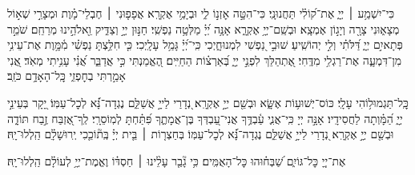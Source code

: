 \documentclass[twoside, openany, parskip=half, 11pt]{book}
\begin{document}
{
\begin{narrow} 
כִּי־יִשְׁמַ֥ע ׀ יְיָ֑ אֶת־ק֝וֹלִ֗י תַּחֲנוּנָֽי׃
כִּי־הִטָּ֣ה אׇזְנ֣וֹ לִ֑י וּבְיָמַ֥י אֶקְרָֽא׃
אֲפָפ֤וּנִי ׀ חֶבְלֵי־מָ֗וֶת וּמְצָרֵ֣י שְׁא֣וֹל מְצָא֑וּנִי צָרָ֖ה וְיָג֣וֹן אֶמְצָֽא׃
וּבְשֵֽׁם־יְיָ֥ אֶקְרָ֑א אָנָּ֥ה יְ֝יָ֗ מַלְּטָ֥ה נַפְשִֽׁי׃
חַנּ֣וּן יְיָ֣ וְצַדִּ֑יק וֵ֖אלֹהֵ֣ינוּ מְרַחֵֽם׃
שֹׁמֵ֣ר פְּתָאיִ֣ם יְיָ֑ דַּ֝לֹּתִ֗י וְלִ֣י יְהוֹשִֽׁיעַ׃
שׁוּבִ֣י נַ֭פְשִׁי לִמְנוּחָ֑יְכִי כִּֽי־יְ֝יָ֗ גָּמַ֥ל עָלָֽיְכִי׃
כִּ֤י חִלַּ֥צְתָּ נַפְשִׁ֗י מִ֫מָּ֥וֶת אֶת־עֵינִ֥י מִן־דִּמְעָ֑ה אֶת־רַגְלִ֥י מִדֶּֽחִי׃
אֶ֭תְהַלֵּךְ לִפְנֵ֣י יְיָ֑ בְּ֝אַרְצ֗וֹת הַחַיִּֽים׃
הֶ֭אֱמַנְתִּי כִּ֣י אֲדַבֵּ֑ר אֲ֝נִ֗י עָנִ֥יתִי מְאֹֽד׃
אֲ֭נִי אָמַ֣רְתִּי בְחׇפְזִ֑י כׇּֽל־הָאָדָ֥ם כֹּזֵֽב׃
\end{narrow}

כׇּֽל־תַּגְמוּל֥וֹהִי עָלָֽי׃
כּוֹס־יְשׁוּע֥וֹת אֶשָּׂ֑א וּבְשֵׁ֖ם יְיָ֣ אֶקְרָֽא׃
נְ֭דָרַי לַייָ֣ אֲשַׁלֵּ֑ם נֶגְדָה־נָּ֗֝א לְכׇל־עַמּֽוֹ׃
יָ֭קָר בְּעֵינֵ֣י יְיָ֑ הַ֝מָּ֗וְתָה לַחֲסִידָֽיו׃
אָנָּ֣ה יְיָ כִּֽי־אֲנִ֢י עַ֫בְדֶּ֥ךָ אֲנִי־עַ֭בְדְּךָ בֶּן־אֲמָתֶ֑ךָ פִּ֝תַּ֗חְתָּ לְמֽוֹסֵרָֽי׃
לְֽךָ־אֶ֭זְבַּח זֶ֣בַח תּוֹדָ֑ה וּבְשֵׁ֖ם יְיָ֣ אֶקְרָֽא׃
נְ֭דָרַי לַייָ֣ אֲשַׁלֵּ֑ם נֶגְדָה־נָּ֗֝א לְכׇל־עַמּֽוֹ׃
בְּחַצְר֤וֹת ׀ בֵּ֤ית יְיָ֗ בְּֽת֘וֹכֵ֤כִי יְֽרוּשָׁלָ֗‍ִם הַֽלְלוּ־יָֽהּ׃

אֶת־יְיָ֭ כׇּל־גּוֹיִ֑ם שַׁ֝בְּח֗וּהוּ כׇּל־הָאֻמִּֽים׃
כִּ֥י גָ֘בַ֤ר עָלֵ֨ינוּ ׀ חַסְדּ֗וֹ וֶאֱמֶת־יְיָ֥ לְעוֹלָ֗ם הַֽלְלוּ־יָֽהּ׃

}
\end{document}
